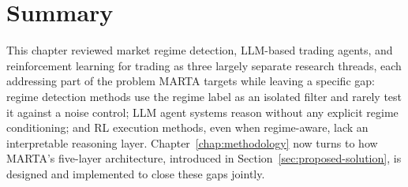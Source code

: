 \section{Summary}
\label{sec:background-summary}

This chapter reviewed market regime detection, LLM-based trading agents, and reinforcement learning for trading as three largely separate research threads, each addressing part of the problem MARTA targets while leaving a specific gap: regime detection methods use the regime label as an isolated filter and rarely test it against a noise control; LLM agent systems reason without any explicit regime conditioning; and RL execution methods, even when regime-aware, lack an interpretable reasoning layer. Chapter~\ref{chap:methodology} now turns to how MARTA's five-layer architecture, introduced in Section~\ref{sec:proposed-solution}, is designed and implemented to close these gaps jointly.